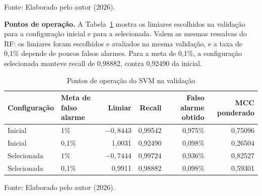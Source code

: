 \documentclass[
    12pt,                %
    openright,           %
    oneside,             %
    a4paper,             %
    english,             %
    brazil               %
]{abntex2}
\begin{document}
\begin{table}
\centering
\caption{Métricas do SVM selecionado na validação (limiar 0)}
\label{tab:svm-metricas-validacao}
\par\smallskip
Fonte: Elaborado pelo autor (2026).
\end{table}

\textbf{Pontos de operação.} A Tabela~\ref{tab:svm-pontos-operacao} mostra os limiares escolhidos na validação para a configuração inicial e para a selecionada. Valem as mesmas ressalvas do RF: os limiares foram escolhidos e avaliados na mesma validação, e a taxa de 0,1\% depende de poucos falsos alarmes. Para a meta de 0,1\%, a configuração selecionada manteve recall de 0,98882, contra 0,92490 da inicial.

\begin{table}
\centering
\caption{Pontos de operação do SVM na validação}
\label{tab:svm-pontos-operacao}
\begin{tabular}{llrrrr}
\hline
Configuração & Meta de falso alarme & Limiar & Recall & Falso alarme obtido & MCC ponderado \\
\hline
Inicial & 1\% & $-0{,}8443$ & 0,99542 & 0,975\% & 0,75096 \\
Inicial & 0,1\% & 1,0031 & 0,92490 & 0,098\% & 0,26504 \\
Selecionada & 1\% & $-0{,}7444$ & 0,99724 & 0,936\% & 0,82527 \\
Selecionada & 0,1\% & 0,9911 & 0,98882 & 0,098\% & 0,59301 \\
\hline
\end{tabular}
\par\smallskip
Fonte: Elaborado pelo autor (2026).
\end{table}
\end{document}
